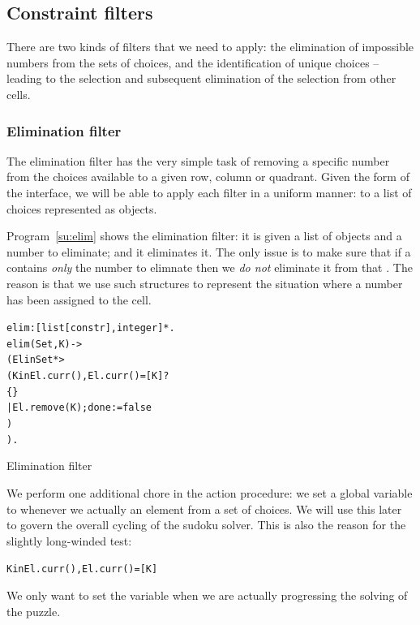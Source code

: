\subsection{Constraint filters}
\label{su:filter}

There are two kinds of filters that we need to apply: the elimination of impossible numbers from the sets of choices, and the identification of unique choices -- leading to the selection and subsequent elimination of the selection from other cells.

\subsubsection{Elimination filter}
The elimination filter has the very simple task of removing a specific number from the choices available to a given row, column or quadrant. Given the form of the  interface, we will be able to apply each filter in a uniform manner: to a list of choices represented as  objects.

Program~\vref{su:elim} shows the elimination filter: it is given a list of  objects and a number to eliminate; and it eliminates it. The only issue is to make sure that if a  contains \emph{only} the number to elimnate then we \emph{do not} eliminate it from that . The reason is that we use such structures to represent the situation where a number has been assigned to the cell.
\begin{program}
\vspace{0.5ex}
\begin{alltt}
elim:[list[constr],integer]*.
elim(Set,K) ->
  (El in Set *>
    (K in El.curr(), El.curr()\bsl=[K]?
      \{\}
    | El.remove(K); done:=false
    )
  ).
\end{alltt}
\vspace{-2ex}
\caption{Elimination filter}
\label{su:elim}
\end{program}
\noindent
We perform one additional chore in the  action procedure: we set a global variable  to  whenever we actually  an element from a set of choices. We will use this later to govern the overall cycling of the sudoku solver. This is also the reason for the slightly long-winded test:
\begin{alltt}
K in El.curr(), El.curr()\bsl=[K]
\end{alltt}
We only want to set the  variable when we are actually progressing the solving of the puzzle.

